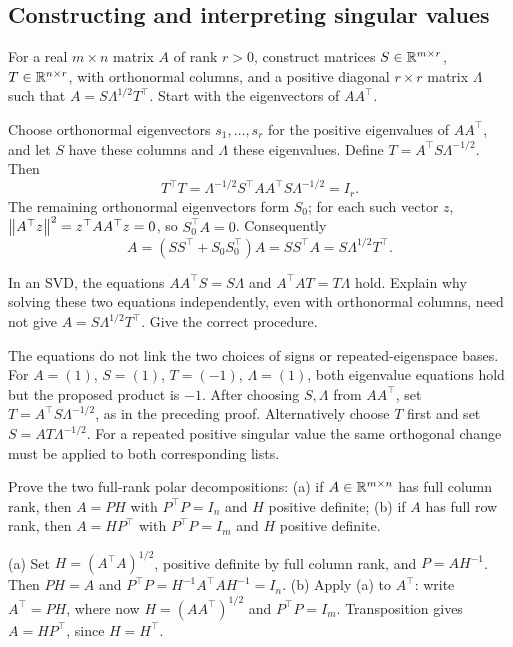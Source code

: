 \subsection*{Constructing and interpreting singular values}

\begin{problem}\label{ex:10:svd-left}
For a real \(m\times n\) matrix \(A\) of rank \(r>0\), construct matrices
\(S\in\mathbb R^{m\times r}\), \(T\in\mathbb R^{n\times r}\), with orthonormal columns,
and a positive diagonal \(r\times r\) matrix \(\Lambda\) such that
\(A=S\Lambda^{1/2}T^\top\). Start with the eigenvectors of \(AA^\top\).
\end{problem}
\begin{solution}
Choose orthonormal eigenvectors \(s_1,\ldots,s_r\) for the positive
eigenvalues of \(AA^\top\), and let \(S\) have these columns and
\(\Lambda\) these eigenvalues. Define \(T=A^\top S\Lambda^{-1/2}\).
Then
\[
T^\top T=\Lambda^{-1/2}S^\top AA^\top S\Lambda^{-1/2}=I_r.
\]
The remaining orthonormal eigenvectors form \(S_0\); for each such vector
\(z\), \(\left\lVert A^\top z\right\rVert^2=z^\top AA^\top z=0\), so \(S_0^\top A=0\).
Consequently
\[
A=(SS^\top+S_0S_0^\top)A=SS^\top A=S\Lambda^{1/2}T^\top.
\]
\end{solution}

\begin{problem}\label{ex:10:linked-vectors}
In an SVD, the equations \(AA^\top S=S\Lambda\) and
\(A^\top AT=T\Lambda\) hold. Explain why solving these two equations
independently, even with orthonormal columns, need not give
\(A=S\Lambda^{1/2}T^\top\). Give the correct procedure.
\end{problem}
\begin{solution}
The equations do not link the two choices of signs or repeated-eigenspace
bases. For \(A=(1)\), \(S=(1)\), \(T=(-1)\), \(\Lambda=(1)\), both
eigenvalue equations hold but the proposed product is \(-1\).
After choosing \(S,\Lambda\) from \(AA^\top\), set
\(T=A^\top S\Lambda^{-1/2}\), as in the preceding proof.
Alternatively choose \(T\) first and set \(S=AT\Lambda^{-1/2}\).
For a repeated positive singular value the same orthogonal change must
be applied to both corresponding lists.
\end{solution}

\begin{problem}\label{ex:10:polar}
Prove the two full-rank polar decompositions:
(a) if \(A\in\mathbb R^{m\times n}\) has full column rank, then \(A=PH\) with
\(P^\top P=I_n\) and \(H\) positive definite;
(b) if \(A\) has full row rank, then \(A=HP^\top\) with \(P^\top P=I_m\)
and \(H\) positive definite.
\end{problem}
\begin{solution}
(a) Set \(H=(A^\top A)^{1/2}\), positive definite by full column rank,
and \(P=AH^{-1}\). Then \(PH=A\) and
\(P^\top P=H^{-1}A^\top AH^{-1}=I_n\).
(b) Apply (a) to \(A^\top\): write \(A^\top=PH\), where now
\(H=(AA^\top)^{1/2}\) and \(P^\top P=I_m\). Transposition gives
\(A=HP^\top\), since \(H=H^\top\).
\end{solution}

